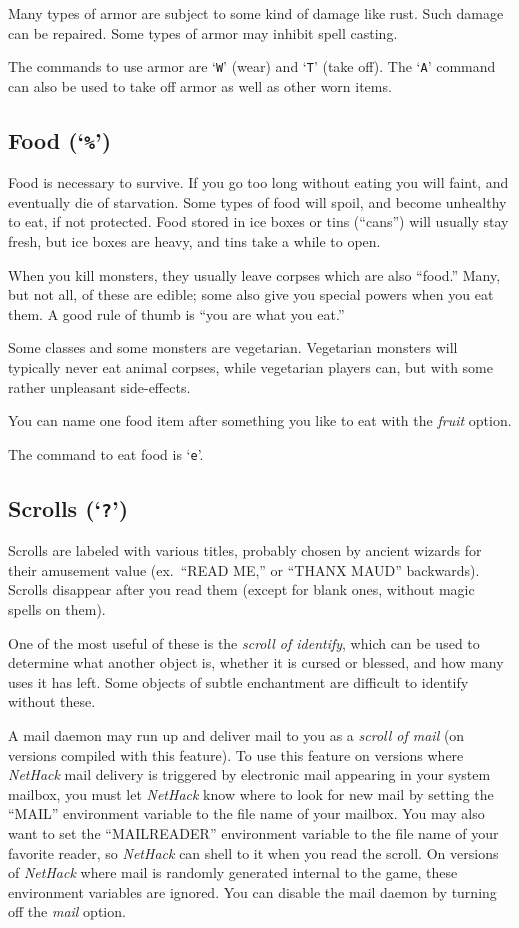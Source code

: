 Many types of armor are subject to some kind of damage like rust.  Such
damage can be repaired.  Some types of armor may inhibit spell casting.

The commands to use armor are `{\tt W}' (wear) and `{\tt T}' (take off).
The `{\tt A}' command can also be used to take off armor as well as other
worn items.

\subsection*{Food (`{\tt \%}')}

Food is necessary to survive.  If you go too long without eating you
will faint, and eventually die of starvation.
Some types of food will spoil, and become unhealthy to eat,
if not protected.
Food stored in ice boxes or tins (``cans'')
will usually stay fresh, but ice boxes are heavy, and tins
take a while to open.

When you kill monsters, they usually leave corpses which are also
``food.''  Many, but not all, of these are edible; some also give you
special powers when you eat them.  A good rule of thumb is ``you are
what you eat.''

Some classes and some monsters are vegetarian.  Vegetarian monsters will
typically never eat animal corpses, while vegetarian players can, but with
some rather unpleasant side-effects.

You can name one food item after something you like to eat with the
{\it fruit\/} option.

The command to eat food is `{\tt e}'.

\subsection*{Scrolls (`{\tt ?}')}

Scrolls are labeled with various titles, probably chosen by ancient wizards
for their amusement value (ex.\ ``READ ME,'' or ``THANX MAUD'' backwards).
Scrolls disappear after you read them (except for blank ones, without
magic spells on them).

One of the most useful of these is the %
{\it scroll of identify}, which
can be used to determine what another object is, whether it is cursed or
blessed, and how many uses it has left.  Some objects of subtle
enchantment are difficult to identify without these.

A mail daemon may run up and deliver mail to you as a %
{\it scroll of mail} (on versions compiled with this feature).
To use this feature on versions where {\it NetHack\/}
mail delivery is triggered by electronic mail appearing in your system mailbox,
you must let {\it NetHack\/} know where to look for new mail by setting the
``MAIL'' environment variable to the file name of your mailbox.
You may also want to set the ``MAILREADER'' environment variable to the
file name of your favorite reader, so {\it NetHack\/} can shell to it when you
read the scroll.
On versions of {\it NetHack\/} where mail is randomly
generated internal to the game, these environment variables are ignored.
You can disable the mail daemon by turning off the
{\it mail\/} option.

